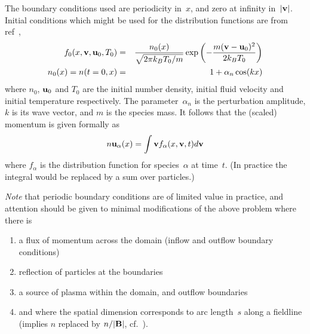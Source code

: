 The boundary conditions used are periodicity in~$x$, and zero at infinity in~$|{\bf v}|$.
Initial conditions which might be used for the distribution functions
are from ref~\cite{Ta13Deve},
\begin{eqnarray}
f_0(x,{\bf v},{\bf u}_0,T_0)&=& \frac{n_0(x)}{\sqrt{2\pi k_B T_0/m}}\exp\left(-\frac{m({\bf v}-{\bf u}_0)^2}{2k_BT_0}\right)  \label{eq:taitano3ics} \\
n_0(x)=n(t=0,x)&=&1 +\alpha_n \cos(k x ) \nonumber
\end{eqnarray}
where $n_0$, ${\bf u}_0$ and  $T_0$ are the 
initial number density, initial fluid velocity and initial temperature respectively. The
parameter~$\alpha_n$ is the perturbation amplitude, $k$ is its wave vector, and $m$ is the
species mass. It follows that the (scaled) momentum is given formally as
\begin{equation}\label{eq:mtmdefn}
n {\bf u}_\alpha(x) = \int {\bf v} f_\alpha (x,{\bf v},t) d{\bf v}
\end{equation}
where $f_\alpha$ is the distribution function for species~$\alpha$ at time~$t$.
(In practice the integral would be replaced by a sum over particles.)

\emph{Note} that periodic boundary conditions are of limited
value in practice, and attention should be given to minimal modifications
of the above  problem where there is
\begin{enumerate}
\item a flux of momentum across the domain (inflow
and outflow boundary conditions)
\item reflection of particles at the boundaries
\item a source of plasma within the domain, and outflow boundaries
\item and where the spatial dimension corresponds to arc length~$s$ along a fieldline
(implies $n$ replaced by $n/|{\bf B}|$, cf.\  ).
\end{enumerate}



